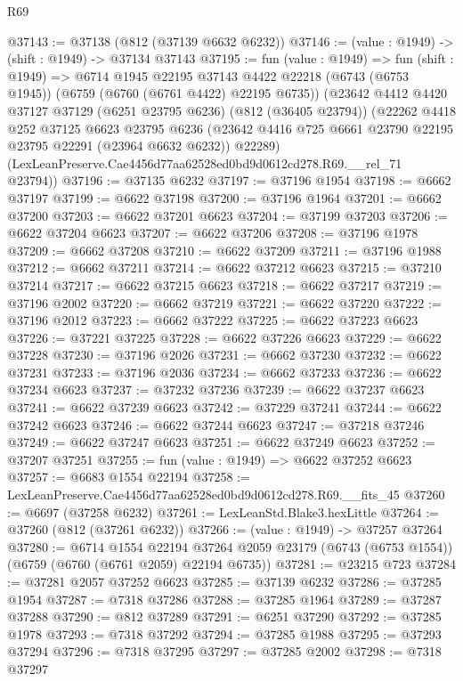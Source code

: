 \begin{lexlean}{R69}
\begin{coremodule}
{@37143 := @37138 (@812 (@37139 @6632 @6232))
@37146 := (value : @1949) -> (shift : @1949) -> @37134 @37143
@37195 := fun (value : @1949) =>
  fun (shift : @1949) =>
  @6714
    @1945
    @22195
    @37143
    @4422
    @22218
    (@6743 (@6753 @1945))
    (@6759 (@6760 (@6761 @4422) @22195 @6735))
    (@23642
      @4412
      @4420
      @37127
      @37129
      (@6251 @23795 @6236)
      (@812 (@36405 @23794))
      (@22262
        @4418
        @252
        @37125
        @6623
        @23795
        @6236
        (@23642 @4416 @725 @6661 @23790 @22195 @23795 @22291 (@23964 @6632 @6232))
        @22289)
      (LexLeanPreserve.Cae4456d77aa62528ed0bd9d0612cd278.R69.__rel_71 @23794))
@37196 := @37135 @6232
@37197 := @37196 @1954
@37198 := @6662 @37197
@37199 := @6622 @37198
@37200 := @37196 @1964
@37201 := @6662 @37200
@37203 := @6622 @37201 @6623
@37204 := @37199 @37203
@37206 := @6622 @37204 @6623
@37207 := @6622 @37206
@37208 := @37196 @1978
@37209 := @6662 @37208
@37210 := @6622 @37209
@37211 := @37196 @1988
@37212 := @6662 @37211
@37214 := @6622 @37212 @6623
@37215 := @37210 @37214
@37217 := @6622 @37215 @6623
@37218 := @6622 @37217
@37219 := @37196 @2002
@37220 := @6662 @37219
@37221 := @6622 @37220
@37222 := @37196 @2012
@37223 := @6662 @37222
@37225 := @6622 @37223 @6623
@37226 := @37221 @37225
@37228 := @6622 @37226 @6623
@37229 := @6622 @37228
@37230 := @37196 @2026
@37231 := @6662 @37230
@37232 := @6622 @37231
@37233 := @37196 @2036
@37234 := @6662 @37233
@37236 := @6622 @37234 @6623
@37237 := @37232 @37236
@37239 := @6622 @37237 @6623
@37241 := @6622 @37239 @6623
@37242 := @37229 @37241
@37244 := @6622 @37242 @6623
@37246 := @6622 @37244 @6623
@37247 := @37218 @37246
@37249 := @6622 @37247 @6623
@37251 := @6622 @37249 @6623
@37252 := @37207 @37251
@37255 := fun (value : @1949) => @6622 @37252 @6623
@37257 := @6683 @1554 @22194
@37258 := LexLeanPreserve.Cae4456d77aa62528ed0bd9d0612cd278.R69.__fits_45
@37260 := @6697 (@37258 @6232)
@37261 := LexLeanStd.Blake3.hexLittle
@37264 := @37260 (@812 (@37261 @6232))
@37266 := (value : @1949) -> @37257 @37264
@37280 := @6714
    @1554
    @22194
    @37264
    @2059
    @23179
    (@6743 (@6753 @1554))
    (@6759 (@6760 (@6761 @2059) @22194 @6735))
@37281 := @23215 @723
@37284 := @37281 @2057 @37252 @6623
@37285 := @37139 @6232
@37286 := @37285 @1954
@37287 := @7318 @37286
@37288 := @37285 @1964
@37289 := @37287 @37288
@37290 := @812 @37289
@37291 := @6251 @37290
@37292 := @37285 @1978
@37293 := @7318 @37292
@37294 := @37285 @1988
@37295 := @37293 @37294
@37296 := @7318 @37295
@37297 := @37285 @2002
@37298 := @7318 @37297
}
\end{coremodule}
\end{lexlean}
